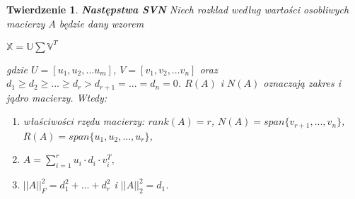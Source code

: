 \documentclass[12pt,a4paper]{report}
\newtheorem{tw}[df]{Twierdzenie}
\begin{document}
\begin{tw}\textbf{Następstwa SVN}%
Niech rozkład według wartości osobliwych macierzy $A$ będzie dany wzorem
\begin{center}
$\mathbb{X}=\mathbb{U}\sum \mathbb{V}^T$
\end{center}
gdzie $U=[u_1,u_2,...u_m]$, $V = [v_1,v_2,...v_n]$ oraz 
$d_1\geq d_2 \geq ... \geq d_r > d_{r+1} = ... = d_n = 0$.
$R(A)$ i $N(A)$ oznaczają zakres i jądro macierzy.
Wtedy:
\begin{enumerate}
\item właściwości rzędu macierzy: $rank(A) = r$, $N(A) = span\{v_{r+1},...,v_n \}$, 
$R(A) = span \{u_1,u_2,...,u_r \}$,
\item $A = \sum_{i=1}^r u_i \cdot d_i \cdot v_i^T,$
\item $||A||_F^2 = d_1^2+...+d_r^2$ i $||A||_2^2 = d_1$.
\end{enumerate}
\end{tw}
\end{document}
